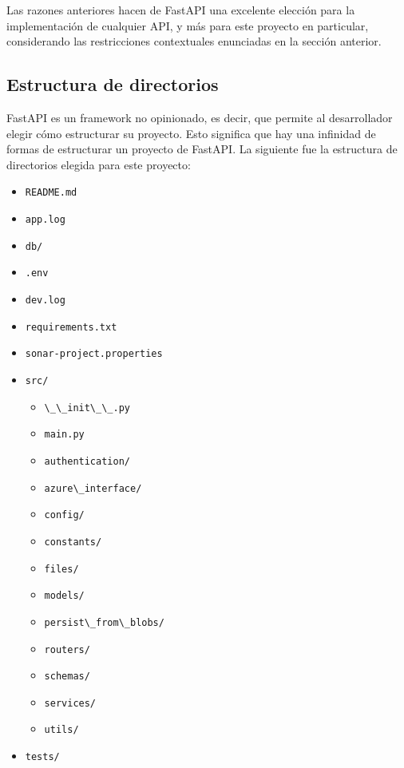 Las razones anteriores hacen de \gls{FastAPI} una excelente elección para la implementación de cualquier \gls{API}, y más para este proyecto en particular, considerando las restricciones contextuales enunciadas en la sección anterior.

\subsection{Estructura de directorios}

\gls{FastAPI} es un framework no opinionado, es decir, que permite al desarrollador elegir cómo estructurar su proyecto. Esto significa que hay una infinidad de formas de estructurar un proyecto de \gls{FastAPI}. La siguiente fue la estructura de directorios elegida para este proyecto:
\begin{itemize}
	\item \lstinline|README.md|
	\item \lstinline|app.log|
	\item \lstinline|db/|
	\item \lstinline|.env|
	\item \lstinline|dev.log|
	\item \lstinline|requirements.txt|
	\item \lstinline|sonar-project.properties|
	\item \lstinline|src/|
	      \begin{itemize}
		      \item \lstinline|\_\_init\_\_.py|
		      \item \lstinline|main.py|
		      \item \lstinline|authentication/|
		      \item \lstinline|azure\_interface/|
		      \item \lstinline|config/|
		      \item \lstinline|constants/|
		      \item \lstinline|files/|
		      \item \lstinline|models/|
		      \item \lstinline|persist\_from\_blobs/|
		      \item \lstinline|routers/|
		      \item \lstinline|schemas/|
		      \item \lstinline|services/|
		      \item \lstinline|utils/|
	      \end{itemize}
	\item \lstinline|tests/|
\end{itemize}

